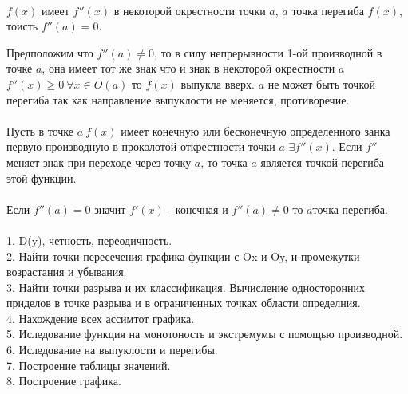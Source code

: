 \\
$f(x)$ имеет $f''(x)$ в некоторой окрестности точки $a$,
$a$ точка перегиба $f(x)$, тоисть $f''(a) = 0$.

 Предположим что $f''(a)\not= 0$, то в
силу непрерывности 1-ой производной в точке $a$, она имеет
тот же знак что и знак в некоторой окрестности $a$
$f''(x)\ge 0 ~ \forall x\in O(a)$ то $f(x)$ выпукла вверх.
$a$ не может быть точкой перегиба так как направление
выпуклости не меняется, противоречие.\\

\\
Пусть в точке $a ~ f(x)$ имеет конечную или бесконечную
определенного занка первую производную в проколотой
открестности точки $a$ $\exists f''(x)$. Если $f''$ меняет
знак при переходе через точку $a$, то точка $a$ является
точкой перегиба этой функции.\\

\\
Если $f''(a) = 0$ значит $f'(x)$ - конечная и
$f''(a) \not= 0$ то $a$точка перегиба.\\

\\
1. D(y), четность, переодичность.\\
2. Найти точки пересечения графика функции с Ox и Oy, и
промежутки возрастания и убывания.\\
3. Найти точки разрыва и их классификация. Вычисление
односторонних приделов в точке разрыва и в ограниченных
точках области определния.\\
4. Нахождение всех ассимтот графика.\\
5. Иследование функция на монотоность и экстремумы с
помощью производной.\\
6. Иследование на выпуклости и перегибы.\\
7. Построение таблицы значений.\\
8. Построение графика.\\
